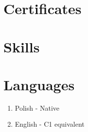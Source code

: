 \documentclass[a4paper, 12pt]{article} %
\begin{document}
\section{Certificates}
\lipsum

\section{Skills}
\lipsum

\section{Languages}
\begin{enumerate} %
    \item Polish - Native
    \item English - C1 equivalent
\end{enumerate}
\end{document}
